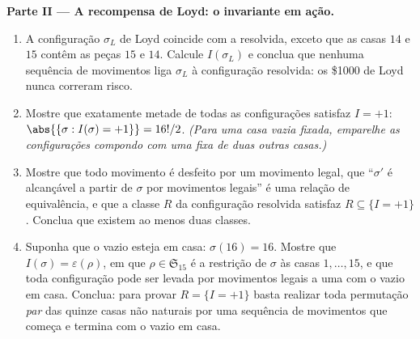 \begin{problem}
\medskip
\noindent\textbf{Parte II --- A recompensa de Loyd: o invariante em
ação.}
\begin{enumerate}[resume]
  \item A configuração $\sigma_L$ de Loyd coincide com a resolvida,
        exceto que as casas $14$ e $15$ contêm as peças $15$ e $14$.
        Calcule $I(\sigma_L)$ e conclua que nenhuma sequência de
        movimentos liga $\sigma_L$ à configuração resolvida:
        os \$1000 de Loyd nunca correram risco.
  \item Mostre que exatamente metade de todas as configurações satisfaz $I =
        +1$: $\abs{\{\sigma : I(\sigma) = +1\}} = 16!/2$.
        \emph{(Para uma casa vazia fixada, emparelhe as configurações
        compondo com uma  fixa de duas outras
        casas.)}
  \item Mostre que todo movimento é desfeito por um movimento legal, que
        ``$\sigma'$ é alcançável a partir de $\sigma$ por movimentos legais'' é
        uma relação de equivalência, e que a classe $R$ da
        configuração resolvida satisfaz $R \subseteq \{I = +1\}$.
        Conclua que existem ao menos duas classes.
  \item Suponha que o vazio esteja em casa: $\sigma(16) = 16$. Mostre que
        $I(\sigma) = \varepsilon(\rho)$, em que $\rho \in
        \mathfrak{S}_{15}$ é a restrição de $\sigma$ às
        casas $1, \dots, 15$, e que toda configuração pode ser
        levada por movimentos legais a uma com o vazio em casa.
        Conclua: para provar $R = \{I = +1\}$ basta realizar
        toda permutação \emph{par} das quinze casas não naturais
        por uma sequência de movimentos que começa e termina com o
        vazio em casa.
\end{enumerate}


\end{problem}
